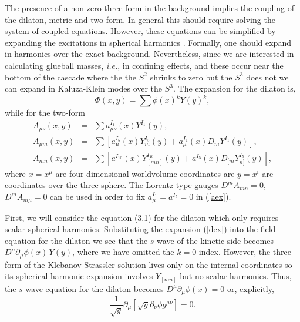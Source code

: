 \documentclass[12pt,epsf,a4paper]{article}
\begin{document}
The presence of a non zero three-form in the  background  
implies the coupling of  the dilaton, metric and two form. 
In general this should require solving the system of coupled equations. However, 
these equations can be simplified by expanding the excitations in 
spherical harmonics \cite{hs}. Formally, one should expand in harmonics over the exact 
background. Nevertheless, since we are interested in calculating glueball masses, {\it i.e.}, 
in confining effects, and these occur near the bottom of the cascade where the  
the $S^2$ shrinks to zero but the $S^3$
does not we can  expand in Kaluza-Klein 
modes over the $S^3$. The expansion for the dilaton is, 
\begin{equation}
\Phi(x,y)= \sum \phi(x)^k Y(y)^k, 
\label{dex}
\end{equation}
while for the two-form
\begin{eqnarray}
A_{\mu \nu} (x,y) & = & \sum a_{\mu \nu}^{I_1} (x) Y^{I_1}(y), \nonumber \\
A_{\mu m} (x,y)   & = & \sum [ a_{\mu}^{I_5} (x) Y_m^{I_5} (y) + a_{\mu}^{I_1} (x) 
D_m Y^{I_1} (y) ], \nonumber \\
A_{mn} (x,y)      & = & \sum [ a^{I_{10}} (x) Y_{[mn]}^{I_{10}} (y) + a^{I_5} (x) 
D_{[m} Y_{n]}^{I_5} (y) ],
\label{aex} 
\end{eqnarray} 
where $x= x^\mu$ are four dimensional worldvolume coordinates are
$y=x^i$ are coordinates over the three sphere. The Lorentz type gauges 
$D^{m} A_{mn}=0$, $D^{m} A_{m \mu} =0$ can be used in order to fix 
$a_{\mu}^{I_1}=a^{I_5}=0$ in (\ref{aex}). 
  
First, we will consider the equation (3.1) for the dilaton which  only requires scalar spherical 
harmonics. Substituting the expansion 
(\ref{dex}) into the field equation for the dilaton we see that 
the $s$-wave of the kinetic side becomes $D^{\mu} \partial_{\mu} \phi(x) \, Y(y)$, 
where we have omitted the $k=0$ index. However, the three-form of the Klebanov-Strassler 
solution \cite{KS} lives only on the internal coordinates so its spherical harmonic 
expansion involves $Y_{[m n]}$ but no scalar harmonics. Thus, 
the $s$-wave equation for the dilaton becomes  
$D^{\mu} \partial_{\mu} \phi (x)=0$ or, explicitly,
\begin{equation}
\frac {1}{\sqrt{g}} \partial_{\mu} [ \sqrt{g} \partial_{\nu} \phi g^{\mu \nu} ] = 0. 
\label{dileq}
\end{equation}
  
\end{document}

